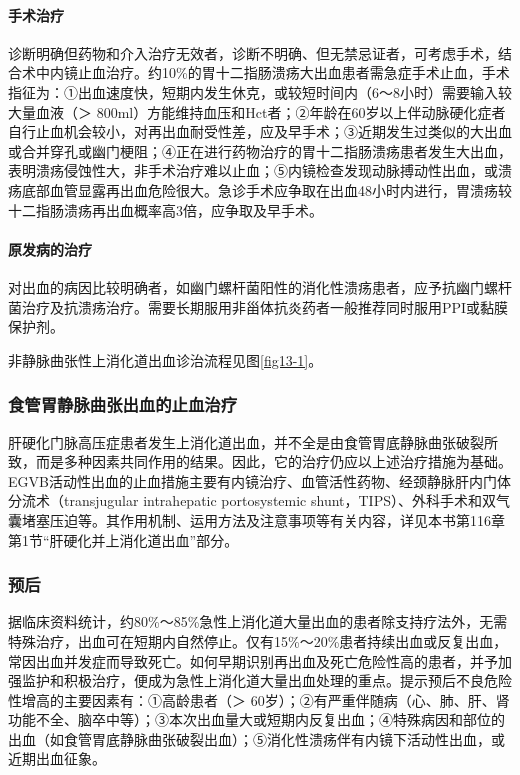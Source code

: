 \paragraph{手术治疗}

诊断明确但药物和介入治疗无效者，诊断不明确、但无禁忌证者，可考虑手术，结合术中内镜止血治疗。约10\%的胃十二指肠溃疡大出血患者需急症手术止血，手术指征为：①出血速度快，短期内发生休克，或较短时间内（6～8小时）需要输入较大量血液（＞
800ml）方能维持血压和Hct者；②年龄在60岁以上伴动脉硬化症者自行止血机会较小，对再出血耐受性差，应及早手术；③近期发生过类似的大出血或合并穿孔或幽门梗阻；④正在进行药物治疗的胃十二指肠溃疡患者发生大出血，表明溃疡侵蚀性大，非手术治疗难以止血；⑤内镜检查发现动脉搏动性出血，或溃疡底部血管显露再出血危险很大。急诊手术应争取在出血48小时内进行，胃溃疡较十二指肠溃疡再出血概率高3倍，应争取及早手术。

\paragraph{原发病的治疗}

对出血的病因比较明确者，如幽门螺杆菌阳性的消化性溃疡患者，应予抗幽门螺杆菌治疗及抗溃疡治疗。需要长期服用非甾体抗炎药者一般推荐同时服用PPI或黏膜保护剂。

非静脉曲张性上消化道出血诊治流程见图\ref{fig13-1}。

\subsubsection{食管胃静脉曲张出血的止血治疗}

肝硬化门脉高压症患者发生上消化道出血，并不全是由食管胃底静脉曲张破裂所致，而是多种因素共同作用的结果。因此，它的治疗仍应以上述治疗措施为基础。EGVB活动性出血的止血措施主要有内镜治疗、血管活性药物、经颈静脉肝内门体分流术（transjugular
intrahepatic portosystemic
shunt，TIPS）、外科手术和双气囊堵塞压迫等。其作用机制、运用方法及注意事项等有关内容，详见本书第116章第1节“肝硬化并上消化道出血”部分。

\subsubsection{预后}

据临床资料统计，约80\%～85\%急性上消化道大量出血的患者除支持疗法外，无需特殊治疗，出血可在短期内自然停止。仅有15\%～20\%患者持续出血或反复出血，常因出血并发症而导致死亡。如何早期识别再出血及死亡危险性高的患者，并予加强监护和积极治疗，便成为急性上消化道大量出血处理的重点。提示预后不良危险性增高的主要因素有：①高龄患者（＞
60岁）；②有严重伴随病（心、肺、肝、肾功能不全、脑卒中等）；③本次出血量大或短期内反复出血；④特殊病因和部位的出血（如食管胃底静脉曲张破裂出血）；⑤消化性溃疡伴有内镜下活动性出血，或近期出血征象。


